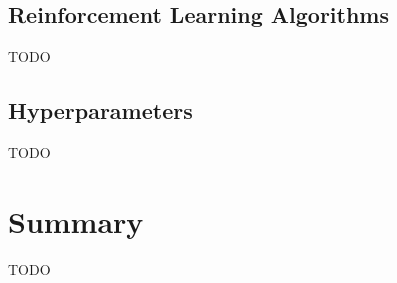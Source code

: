 \documentclass[../xlapes02]{subfiles}
\begin{document}

    \subsection{Reinforcement Learning Algorithms}\label{subsec:rl-algorithms}
    TODO

    \subsection{Hyperparameters}\label{subsec:hyperparameters}
    TODO


    \section{Summary}\label{sec:summary}
    TODO
\end{document}
